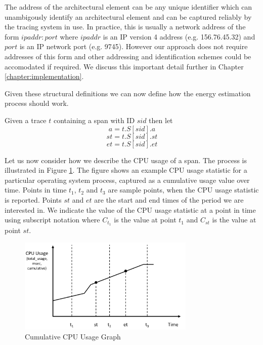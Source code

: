 The address of the architectural element can be any unique identifier which can unambigously identify an architectural element and can be captured reliably by the tracing system in use.  In practice, this is usually a network address of the form $ipaddr:port$ where $ipaddr$ is an IP version 4 address (e.g. 156.76.45.32) and $port$ is an IP network port (e.g. 9745).  However our approach does not require addresses of this form and other addressing and identification schemes could be accomodated if required.  We discuss this important detail further in Chapter \ref{chapter:implementation}.

Given these structural definitions we can now define how the energy estimation process should work.

Given a trace $t$ containing a span with ID $sid$ then let
\begin{equation}
a = t.S[sid].a
\end{equation}
\begin{equation}
st = t.S[sid].st
\end{equation}
\begin{equation}
et = t.S[sid].et
\end{equation}

Let us now consider how we describe the CPU usage of a span.  The process is illustrated in Figure \ref{figure:graph}.  The figure shows an example CPU usage statistic for a particular operating system process, captured as a cumulative usage value over time.  Points in time $t_{1}$, $t_{2}$ and $t_{3}$ are sample points, when the CPU usage statistic is reported.  Points $st$ and $et$ are the start and end times of the period we are interested in.  We indicate the value of the CPU usage statistic at a point in time using subscript notation where $C_{t_{1}}$ is the value at point $t_{1}$ and $C_{st}$ is the value at point $st$.

\begin{figure}
\centering
\includegraphics[width=0.75\textwidth]{Figures/estimating-energy-graph}
\caption{Cumulative CPU Usage Graph}
\label{figure:graph}
\end{figure}

